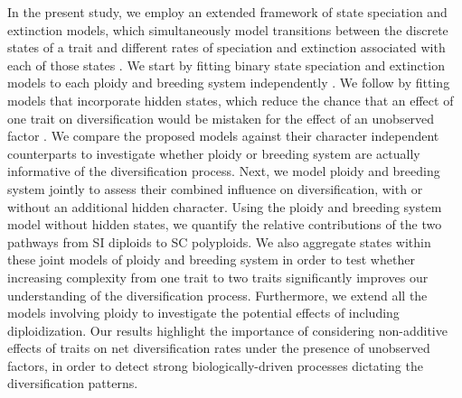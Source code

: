 In the present study, we employ an extended framework of state speciation and extinction models, which simultaneously model transitions between the discrete states of a trait and different rates of speciation and extinction associated with each of those states \citep[`SSE' models;][]{maddison_2007, fitzjohn_2012}.
We start by fitting binary state speciation and extinction models to each ploidy and breeding system independently \citep{maddison_2007}.
We follow by fitting models that incorporate hidden states, which reduce the chance that an effect of one trait on diversification would be mistaken for the effect of an unobserved factor \citep{beaulieu_2016}.
We compare the proposed models against their character independent counterparts \citep{beaulieu_2016} to investigate whether ploidy or breeding system are actually informative of the diversification process.
Next, we model ploidy and breeding system jointly to assess their combined influence on diversification, with or without an additional hidden character.
Using the ploidy and breeding system model without hidden states, we quantify the relative contributions of the two pathways from SI diploids to SC polyploids.
We also aggregate states within these joint models of ploidy and breeding system in order to test whether increasing complexity from one trait to two traits significantly improves our understanding of the diversification process.
Furthermore, we extend all the models involving ploidy to investigate the potential effects of including diploidization.
Our results highlight the importance of considering non-additive effects of traits on net diversification rates  under the presence of unobserved factors, in order to detect strong biologically-driven processes dictating the diversification patterns.
